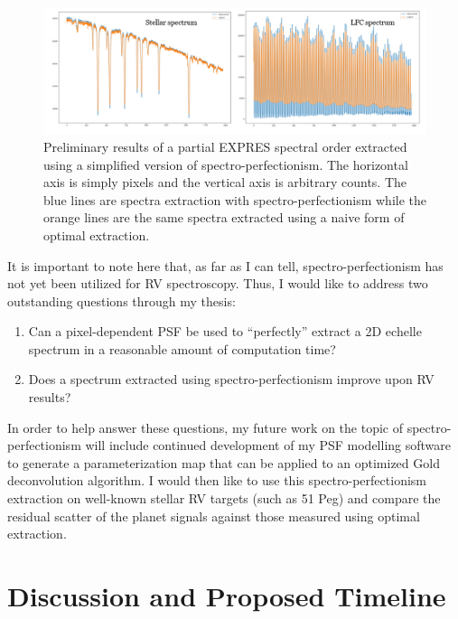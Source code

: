 \documentclass[11pt]{article}
\begin{document}
\begin{figure}
    \centering
    \includegraphics[width=\textwidth]{images/sp_test.png}
    \caption{Preliminary results of a partial EXPRES spectral order extracted using a simplified version of spectro-perfectionism. The horizontal axis is simply pixels and the vertical axis is arbitrary counts. The blue lines are spectra extraction with spectro-perfectionism while the orange lines are the same spectra extracted using a naive form of optimal extraction.}
    \label{fig:sp_test}
\end{figure}

It is important to note here that, as far as I can tell, spectro-perfectionism has not yet been utilized for RV spectroscopy. Thus, I would like to address two outstanding questions through my thesis:
\begin{enumerate}
    \item Can a pixel-dependent PSF be used to ``perfectly'' extract a 2D echelle spectrum in a reasonable amount of computation time?
    \item Does a spectrum extracted using spectro-perfectionism improve upon RV results?
\end{enumerate}
In order to help answer these questions, my future work on the topic of spectro-perfectionism will include continued development of my PSF modelling software to generate a parameterization map that can be applied to an optimized Gold deconvolution algorithm. I would then like to use this spectro-perfectionism extraction on well-known stellar RV targets (such as 51 Peg) and compare the residual scatter of the planet signals against those measured using optimal extraction.

\section{Discussion and Proposed Timeline}
\end{document}
